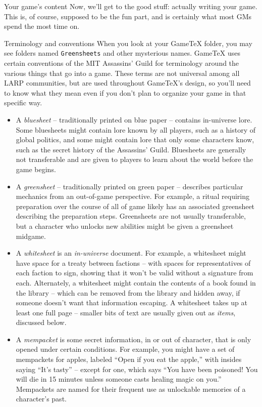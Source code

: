 \documentclass{article}
\newcommand{\gametex}{GameTeX}
\begin{document}
\begin{section}{Your game's content}
Now, we'll get to the good stuff: actually writing your game.  This is, of course, supposed to be the fun part, and is certainly what most GMs spend the most time on.

\begin{subsection}{Terminology and conventions}
When you look at your \gametex{} folder, you may see folders named \texttt{Greensheets} and other mysterious names.  \gametex{} uses certain conventions of the MIT Assassins' Guild for terminology around the various things that go into a game.  These terms are not universal among all LARP communities, but are used throughout \gametex{}'s design, so you'll need to know what they mean even if you don't plan to organize your game in that specific way.
\begin{itemize}
    \item A \textit{bluesheet} -- traditionally printed on blue paper -- contains in-universe lore.  Some bluesheets might contain lore known by all players, such as a history of global politics, and some might contain lore that only some characters know, such as the secret history of the Assassins' Guild.  Bluesheets are generally not transferable and are given to players to learn about the world before the game begins.
    \item A \textit{greensheet} -- traditionally printed on green paper -- describes particular mechanics from an out-of-game perspective.  For example, a ritual requiring preparation over the course of all of game likely has an associated greensheet describing the preparation steps.  Greensheets are not usually transferable, but a character who unlocks new abilities might be given a greensheet midgame.
    \item A \textit{whitesheet} is an \emph{in-universe} document.  For example, a whitesheet might have space for a treaty between factions -- with spaces for representatives of each faction to sign, showing that it won't be valid without a signature from each.  Alternately, a whitesheet might contain the contents of a book found in the library -- which can be removed from the library and hidden away, if someone doesn't want that information escaping.  A whitesheet takes up at least one full page – smaller bits of text are usually given out as \textit{items}, discussed below.
    \item A \textit{mempacket} is some secret information, in or out of character, that is only opened under certain conditions.  For example, you might have a set of mempackets for apples, labeled ``Open if you eat the apple,'' with insides saying ``It's tasty'' -- except for one, which says ``You have been poisoned!  You will die in 15 minutes unless someone casts healing magic on you.'' Mempackets are named for their frequent use as unlockable memories of a character's past.

\end{itemize}
\end{subsection}
\end{section}
\end{document}
